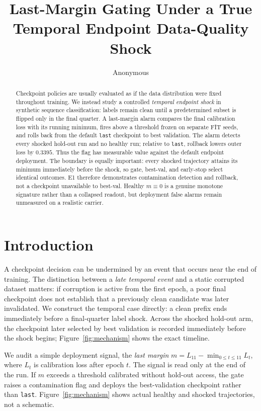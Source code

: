 \documentclass{article} %
\title{Last-Margin Gating Under a True Temporal Endpoint Data-Quality Shock}
\author{Anonymous}
\theoremstyle{remark}
\begin{document}
\maketitle

\begin{abstract}
Checkpoint policies are usually evaluated as if the data distribution were fixed throughout
training. We instead study a controlled \emph{temporal endpoint shock} in synthetic sequence
classification: labels remain clean until a predetermined subset is flipped only in the final
quarter. A last-margin alarm compares the final calibration loss with its running minimum, fires
above a threshold frozen on separate FIT seeds, and rolls back from the default \texttt{last}
checkpoint to best validation. The alarm detects every shocked hold-out run and no healthy run;
relative to \texttt{last}, rollback lowers outer loss by $0.3395$. Thus the flag has measurable
value against the default endpoint deployment. The boundary is equally important: every shocked
trajectory attains its minimum immediately before the shock, so gate, best-val, and early-stop
select identical outcomes. E1 therefore demonstrates contamination detection and rollback, not a
checkpoint unavailable to best-val. Healthy $m\equiv0$ is a genuine monotone signature rather
than a collapsed readout, but deployment false alarms remain unmeasured on a realistic carrier.
\end{abstract}

\section{Introduction}
\label{sec:intro}

A checkpoint decision can be undermined by an event that occurs near the end of training. The
distinction between a \emph{late temporal event} and a static corrupted dataset matters: if
corruption is active from the first epoch, a poor final checkpoint does not establish that a
previously clean candidate was later invalidated. We construct the temporal case directly: a clean
prefix ends immediately before a final-quarter label shock. Across the shocked hold-out arm, the
checkpoint later selected by best validation is recorded immediately before the shock begins;
Figure~\ref{fig:mechanism} shows the exact timeline.

We audit a simple deployment signal, the \emph{last margin}
$m=L_{11}-\min_{0\leq t\leq11}L_t$, where $L_t$ is calibration loss after epoch $t$. The signal is
read only at the end of the run. If $m$ exceeds a threshold calibrated without hold-out access, the
gate raises a contamination flag and deploys the best-validation checkpoint rather than
\texttt{last}. Figure~\ref{fig:mechanism} shows actual healthy and shocked trajectories, not a
schematic.
\end{document}
